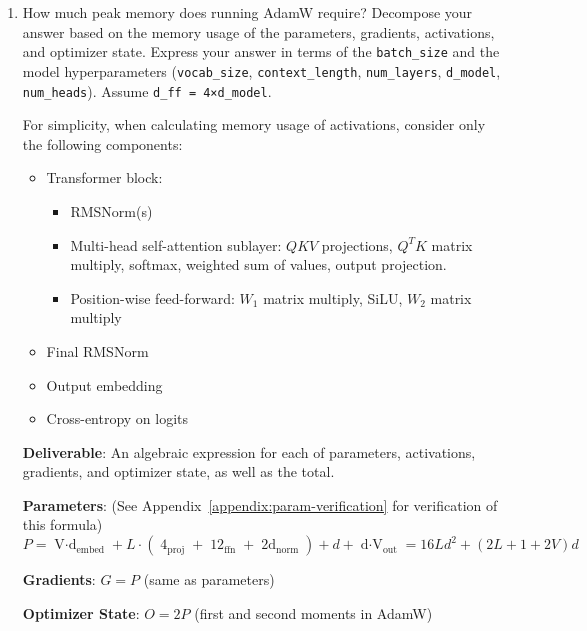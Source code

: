 \begin{enumerate}[label=(\alph*)]
    \item How much peak memory does running AdamW require? Decompose your answer based on the memory usage of the parameters, gradients, activations, and optimizer state. Express your answer in terms of the \lstinline{batch_size} and the model hyperparameters (\lstinline{vocab_size}, \lstinline{context_length}, \lstinline{num_layers}, \lstinline{d_model}, \lstinline{num_heads}). Assume \lstinline{d_ff = 4×d_model}.

    For simplicity, when calculating memory usage of activations, consider only the following components:
    \begin{itemize}
        \item Transformer block:
        \begin{itemize}
            \item RMSNorm(s)
            \item Multi-head self-attention sublayer: $QKV$ projections, $Q^T K$ matrix multiply, softmax, weighted sum of values, output projection.
            \item Position-wise feed-forward: $W_1$ matrix multiply, SiLU, $W_2$ matrix multiply
        \end{itemize}
        \item Final RMSNorm
        \item Output embedding
        \item Cross-entropy on logits
    \end{itemize}

    \textbf{Deliverable}: An algebraic expression for each of parameters, activations, gradients, and optimizer state, as well as the total.

    \begin{answer}
    \textbf{Parameters}: (See Appendix~\ref{appendix:param-verification} for verification of this formula)
    \begin{equation*}
        P = \mathop{V \cdot d}_{\text{embed}} + 
        L \cdot (
            \mathop{4d^2}_{\text{proj}} + 
            \mathop{12d^2}_{\text{ffn}} + 
            \mathop{2d}_{\text{norm}}
        ) + d + \mathop{d \cdot V}_{\text{out}} 
        = 16L d^2 + (2L + 1 + 2V)d
    \end{equation*}

    \textbf{Gradients}: $G = P$ (same as parameters)

    \textbf{Optimizer State}: $O = 2P$ (first and second moments in AdamW)


\end{answer}
\end{enumerate}
